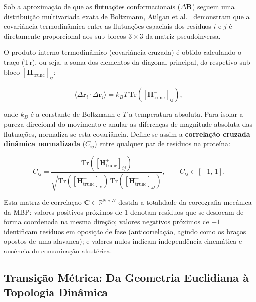 \documentclass[12pt, a4paper]{article}
\begin{document}
Sob a aproximação de que as flutuações conformacionais ($\Delta\mathbf{R}$) seguem uma distribuição multivariada exata de Boltzmann, Atilgan et al.~\cite{atilgan2001} demonstram que a covariância termodinâmica entre as flutuações espaciais dos resíduos $i$ e $j$ é diretamente proporcional aos sub-blocos $3 \times 3$ da matriz pseudoinversa. 

O produto interno termodinâmico (covariância cruzada) é obtido calculando o traço ($\mathrm{Tr}$), ou seja, a soma dos elementos da diagonal principal, do respetivo sub-bloco $[\mathbf{H}^+_{\text{trunc}}]_{ij}$:

\begin{equation}\label{eq:covariancia}
\langle \Delta\mathbf{r}_i \cdot \Delta\mathbf{r}_j \rangle = k_B T \, \mathrm{Tr}\left(\left[\mathbf{H}^+_{\text{trunc}}\right]_{ij}\right),
\end{equation}

onde $k_B$ é a constante de Boltzmann e $T$ a temperatura absoluta. Para isolar a pureza direcional do movimento e anular as diferenças de magnitude absoluta das flutuações, normaliza-se esta covariância. Define-se assim a \textbf{correlação cruzada dinâmica normalizada} ($C_{ij}$) entre qualquer par de resíduos na proteína:

\begin{equation}\label{eq:correlacao}
C_{ij} = \frac{\mathrm{Tr}\left(\left[\mathbf{H}^+_{\text{trunc}}\right]_{ij}\right)} {\sqrt{\mathrm{Tr}\left(\left[\mathbf{H}^+_{\text{trunc}}\right]_{ii}\right)\,\mathrm{Tr}\left(\left[\mathbf{H}^+_{\text{trunc}}\right]_{jj}\right)}}, \qquad C_{ij} \in [-1,\,1].
\end{equation}

Esta matriz de correlação $\mathbf{C} \in \mathbb{R}^{N \times N}$ destila a totalidade da coreografia mecânica da MBP: valores positivos próximos de $1$ denotam resíduos que se deslocam de forma coordenada na mesma direção; valores negativos próximos de $-1$ identificam resíduos em oposição de fase (anticorrelação, agindo como os braços opostos de uma alavanca); e valores nulos indicam independência cinemática e ausência de comunicação alostérica.

\subsection{Transição Métrica: Da Geometria Euclidiana à Topologia Dinâmica}
\label{sec:metrica_topologica}
\end{document}
